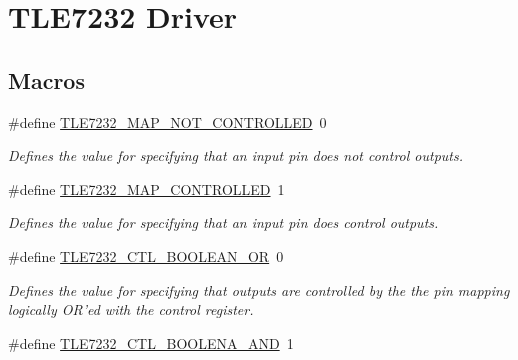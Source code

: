 \hypertarget{group__tle7232__driver}{\section{T\-L\-E7232 Driver}
\label{group__tle7232__driver}
}
\subsection*{Macros}
\begin{DoxyCompactItemize}
\item 
\hypertarget{group__tle7232__driver_ga9831033e1b4daac75b5942977df10b9d}{\#define \hyperlink{group__tle7232__driver_ga9831033e1b4daac75b5942977df10b9d}{T\-L\-E7232\-\_\-\-M\-A\-P\-\_\-\-N\-O\-T\-\_\-\-C\-O\-N\-T\-R\-O\-L\-L\-E\-D}~0}\label{group__tle7232__driver_ga9831033e1b4daac75b5942977df10b9d}

\begin{DoxyCompactList}\small\item\em Defines the value for specifying that an input pin does not control outputs. \end{DoxyCompactList}\item 
\hypertarget{group__tle7232__driver_ga716b363f498d2bb22bd3ab86026539be}{\#define \hyperlink{group__tle7232__driver_ga716b363f498d2bb22bd3ab86026539be}{T\-L\-E7232\-\_\-\-M\-A\-P\-\_\-\-C\-O\-N\-T\-R\-O\-L\-L\-E\-D}~1}\label{group__tle7232__driver_ga716b363f498d2bb22bd3ab86026539be}

\begin{DoxyCompactList}\small\item\em Defines the value for specifying that an input pin does control outputs. \end{DoxyCompactList}\item 
\hypertarget{group__tle7232__driver_ga998bfd9163083c1fd3904a5f4653ff7c}{\#define \hyperlink{group__tle7232__driver_ga998bfd9163083c1fd3904a5f4653ff7c}{T\-L\-E7232\-\_\-\-C\-T\-L\-\_\-\-B\-O\-O\-L\-E\-A\-N\-\_\-\-O\-R}~0}\label{group__tle7232__driver_ga998bfd9163083c1fd3904a5f4653ff7c}

\begin{DoxyCompactList}\small\item\em Defines the value for specifying that outputs are controlled by the the pin mapping logically O\-R'ed with the control register. \end{DoxyCompactList}\item 
\hypertarget{group__tle7232__driver_ga7f1c5d057eda9473d87183dca9d1beac}{\#define \hyperlink{group__tle7232__driver_ga7f1c5d057eda9473d87183dca9d1beac}{T\-L\-E7232\-\_\-\-C\-T\-L\-\_\-\-B\-O\-O\-L\-E\-N\-A\-\_\-\-A\-N\-D}~1}\label{group__tle7232__driver_ga7f1c5d057eda9473d87183dca9d1beac}


\end{DoxyCompactItemize}
